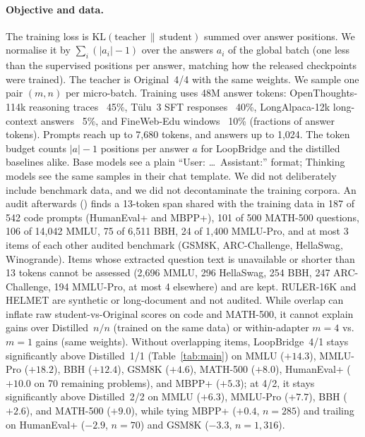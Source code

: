 \documentclass[11pt]{article}
\begin{document}
\paragraph{Objective and data.} The training loss is $\mathrm{KL}(\text{teacher}\,\|\,\text{student})$ summed over
answer positions. We normalise it by $\sum_i(|a_i|-1)$ over the answers $a_i$ of the global batch (one less than the
supervised positions per answer, matching how the released checkpoints were trained). The teacher is Original~4/4 with
the same weights. We sample one pair $(m,n)$ per micro-batch. Training uses 48M answer tokens: OpenThoughts-114k
reasoning traces~\citep{openthoughts} 45\%, T{\"u}lu~3 SFT responses~\citep{tulu3} 40\%, LongAlpaca-12k long-context
answers~\citep{longlora} 5\%, and FineWeb-Edu windows~\citep{fineweb} 10\% (fractions of answer tokens). Prompts reach
up to 7,680 tokens, and answers up to 1,024. The token budget counts $|a|-1$ positions per answer $a$ for LoopBridge and
the distilled baselines alike. Base models see a plain ``User: \ldots\ Assistant:'' format; Thinking models see the same
samples in their chat template. We did not deliberately include benchmark data, and we did not decontaminate the
training corpora. An audit afterwards () finds a 13-token span shared with the
training data in 187 of 542 code prompts (HumanEval+ and MBPP+), 101 of 500 MATH-500 questions, 106 of 14,042 MMLU, 75
of 6,511 BBH, 24 of 1,400 MMLU-Pro, and at most 3 items of each other audited benchmark (GSM8K, ARC-Challenge, HellaSwag,
Winogrande). Items whose extracted question text is unavailable or shorter than 13 tokens cannot be assessed (2,696 MMLU,
296 HellaSwag, 254 BBH, 247 ARC-Challenge, 194 MMLU-Pro, at most 4 elsewhere) and are kept. RULER-16K and HELMET are
synthetic or long-document and not audited. While overlap can inflate raw student-vs-Original scores on code and
MATH-500, it cannot explain gains over Distilled~$n/n$ (trained on the same data) or within-adapter $m=4$ vs.\ $m=1$
gains (same weights). Without overlapping items, LoopBridge~4/1 stays significantly above Distilled~1/1
(Table~\ref{tab:main}) on MMLU ($+14.3$), MMLU-Pro ($+18.2$), BBH ($+12.4$), GSM8K ($+4.6$), MATH-500 ($+8.0$),
HumanEval+ ($+10.0$ on 70 remaining problems), and MBPP+ ($+5.3$); at 4/2, it stays significantly above Distilled~2/2 on
MMLU ($+6.3$), MMLU-Pro ($+7.7$), BBH ($+2.6$), and MATH-500 ($+9.0$), while tying MBPP+ ($+0.4$, $n{=}285$) and
trailing on HumanEval+ ($-2.9$, $n{=}70$) and GSM8K ($-3.3$, $n{=}1{,}316$).
\end{document}
